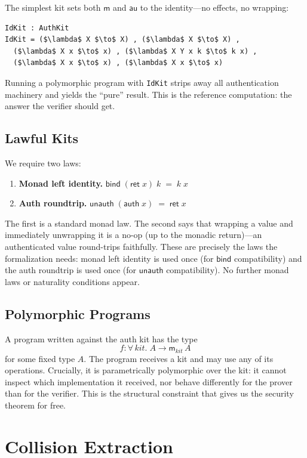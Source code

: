 \documentclass[acmsmall,screen,review,anonymous]{acmart}
\begin{document}
The simplest kit sets both $\mathsf{m}$ and $\mathsf{au}$ to the
identity---no effects, no wrapping:
%
\begin{lstlisting}
IdKit : AuthKit
IdKit = ($\lambda$ X $\to$ X) , ($\lambda$ X $\to$ X) ,
  ($\lambda$ X x $\to$ x) , ($\lambda$ X Y x k $\to$ k x) ,
  ($\lambda$ X x $\to$ x) , ($\lambda$ X x $\to$ x)
\end{lstlisting}
%
Running a polymorphic program with \texttt{IdKit} strips away all
authentication machinery and yields the ``pure'' result.  This is the
reference computation: the answer the verifier should get.

\subsection{Lawful Kits}

We require two laws:
%
\begin{enumerate}
\item \textbf{Monad left identity.}\;
  $\mathsf{bind}\;(\mathsf{ret}\;x)\;k \;=\; k\;x$
\item \textbf{Auth roundtrip.}\;
  $\mathsf{unauth}\;(\mathsf{auth}\;x) \;=\; \mathsf{ret}\;x$
\end{enumerate}
%
The first is a standard monad law.  The second says that wrapping a
value and immediately unwrapping it is a no-op (up to the monadic
return)---an authenticated value round-trips faithfully.  These are
precisely the laws the formalization needs: monad left identity is used
once (for $\mathsf{bind}$ compatibility) and the auth roundtrip is used
once (for $\mathsf{unauth}$ compatibility).  No further monad laws or
naturality conditions appear.

\subsection{Polymorphic Programs}

A program written against the auth kit has the type
\[
  f : \forall\, \mathit{kit}.\; A \to \mathsf{m}_{\mathit{kit}}\,A
\]
for some fixed type $A$.  The program receives a kit and may use any of
its operations.  Crucially, it is parametrically polymorphic over the
kit: it cannot inspect which implementation it received, nor behave
differently for the prover than for the verifier.  This is the
structural constraint that gives us the security theorem for free.

\section{Collision Extraction}\label{sec:extraction}
\end{document}

